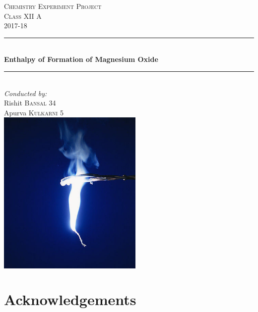 \documentclass[12pt, twoside]{report}
\numberwithin{equation}{section}
\begin{document}
\begin{titlepage}
  
\newcommand{\HRule}{\rule{\linewidth}{0.5mm}}

\center
\vspace*{3cm} 

\textsc{\LARGE Chemistry Experiment Project}\\[1.5cm]
\textsc{\Large Class XII A}\\[0.5cm]
\textsc{\large 2017-18}\\[0.5cm]


\HRule \\[0.4cm]
{ \LARGE \bfseries Enthalpy of Formation of Magnesium Oxide}\\[0.4cm]
\HRule \\[1.5cm]
 

\Large \emph{Conducted by:}\\
\large Rishit \textsc{Bansal 34}\\
\large Apurva \textsc{Kulkarni 5}\\[2cm]

\includegraphics[width=7cm]{title}
\vfill

\end{titlepage}
\cleardoublepage
\chapter{Acknowledgements}

\cleardoublepage
\tableofcontents
\cleardoublepage
\end{document}
